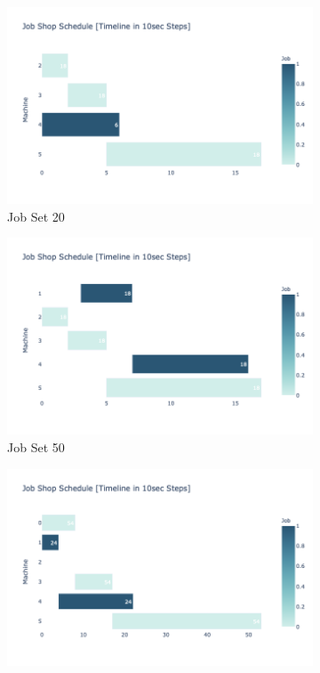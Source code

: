 \begin{figure}[H]
\begin{subfigure}[b]{0.445\textwidth}
            \includegraphics[trim={0 0 2.6cm 0}, clip, width=\textwidth]{images/Job20}
            \caption[]%
            {{\small Job Set 20}}    
            \label{fig:JobSet20}
        \end{subfigure}
        \hfill
        \begin{subfigure}[b]{0.445\textwidth}   
            \centering 
            \includegraphics[trim={0 0 2.6cm 0}, clip,width=\textwidth]{images/Job50}
            \caption[]%
            {{\small Job Set 50}}    
            \label{fig:JobSet50}
        \end{subfigure}
        \hfill
        \begin{subfigure}[b]{0.445\textwidth}
            \centering
            \includegraphics[trim={0 0 2.6cm 0}, clip,width=\textwidth]{images/Job100}

\end{subfigure}
\end{figure}
